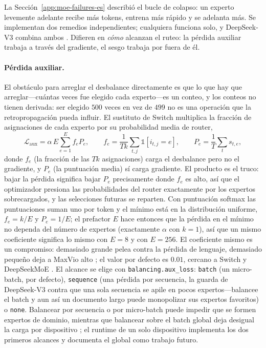 La Sección~\ref{app:moe-failures-es} describió el bucle de colapso: un experto
levemente adelante recibe más tokens, entrena más rápido y se adelanta más. Se
implementan dos remedios independientes; cualquiera funciona solo, y
DeepSeek-V3 combina ambos \citep{deepseek2024v3}. Difieren en \emph{cómo}
alcanzan el ruteo: la pérdida auxiliar trabaja a través del gradiente, el sesgo
trabaja por fuera de él.

\paragraph{Pérdida auxiliar.}
El obstáculo para arreglar el desbalance directamente es que lo que hay que
arreglar---cuántas veces fue elegido cada experto---es un conteo, y los conteos
no tienen derivada: ser elegido $500$ veces en vez de $499$ no es una operación
que la retropropagación pueda influir. El sustituto de Switch
\citep{fedus2021switch} multiplica la fracción de asignaciones de cada experto
por su probabilidad media de router,
\begin{equation}
  \mathcal{L}_{\text{aux}} = \alpha\,E \sum_{e=1}^{E} f_e P_e,
  \qquad
  f_e = \frac{1}{Tk}\sum_{t,j}\mathbb{1}[i_{t,j}=e],
  \qquad
  P_e = \frac{1}{T}\sum_{t} s_{t,e},
  \label{eq:aux-es}
\end{equation}
donde $f_e$ (la fracción de las $Tk$ asignaciones) carga el desbalance pero no
el gradiente, y $P_e$ (la puntuación media) sí carga gradiente. El producto es
el truco: bajar la pérdida significa bajar $P_e$ precisamente donde $f_e$ es
alto, así que el optimizador presiona las probabilidades del router exactamente
por los expertos sobrecargados, y las selecciones futuras se reparten. Con
puntuación softmax las puntuaciones suman uno por token y el mínimo está en la
distribución uniforme, $f_e = k/E$ y $P_e = 1/E$; el prefactor $E$ hace entonces
que la pérdida en el mínimo no dependa del número de expertos (exactamente
$\alpha$ con $k{=}1$), así que un mismo coeficiente significa lo mismo con
$E{=}8$ y con $E{=}256$. El coeficiente mismo es un compromiso: demasiado
grande pelea contra la pérdida de lenguaje, demasiado pequeño deja a MaxVio
alto \citep{wang2024auxfree}; el valor por defecto es $0.01$, cercano a Switch
y DeepSeekMoE \citep{fedus2021switch,dai2024deepseekmoe}. El alcance se elige
con \texttt{balancing.aux\_loss}: \texttt{batch} (un micro-batch, por
defecto), \texttt{sequence} (una pérdida por secuencia, la guarda de
DeepSeek-V3 contra que una sola secuencia se apile en pocos expertos---balancee
el batch y aun así un documento largo puede monopolizar sus expertos
favoritos) o \texttt{none}. Balancear por secuencia o por micro-batch puede
impedir que se formen expertos de dominio, mientras que balancear sobre el
batch global deja desigual la carga por dispositivo \citep{qiu2025demons}; el
runtime de un solo dispositivo implementa los dos primeros alcances y
documenta el global como trabajo futuro.

